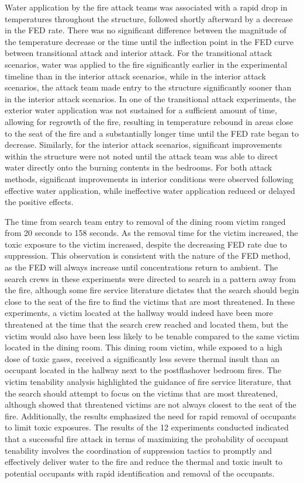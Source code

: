\documentclass[12pt,oneside]{article}
\begin{document}
Water application by the fire attack teams was associated with a rapid drop in temperatures throughout the structure, followed shortly afterward by a decrease in the FED rate. There was no significant difference between the magnitude of the temperature decrease or the time until the inflection point in the FED curve between transitional attack and interior attack. For the transitional attack scenarios, water was applied to the fire significantly earlier in the experimental timeline than in the interior attack scenarios, while in the interior attack scenarios, the attack team made entry to the structure significantly sooner than in the interior attack scenarios. In one of the transitional attack experiments, the exterior water application was not sustained for a sufficient amount of time, allowing for regrowth of the fire, resulting in temperature rebound in areas close to the seat of the fire and a substantially longer time until the FED rate began to decrease. Similarly, for the interior attack scenarios, significant improvements within the structure were not noted until the attack team was able to direct water directly onto the burning contents in the bedrooms. For both attack methods, significant improvements in  interior conditions were observed following effective water application, while ineffective water application reduced or delayed the positive effects.

The time from search team entry to removal of the dining room victim ranged from 20 seconds to 158 seconds.  As the removal time for the victim increased, the toxic exposure to the victim increased, despite the decreasing FED rate due to suppression. This observation is consistent with the nature of the FED method, as the FED will always increase until concentrations return to ambient. The search crews in these experiments were directed to search in a pattern away from the fire, although some fire service literature dictates that the search should begin close to the seat of the fire to find the victims that are most threatened. In these experiments, a victim located at the hallway would indeed have been more threatened at the time that the search crew reached and located them, but the victim would also have been less likely to be tenable compared to the same victim located in the dining room. This dining room victim, while exposed to a high dose of toxic gases, received a significantly less severe thermal insult than an occupant located in the hallway next to the postflashover bedroom fires. The victim tenability analysis highlighted the guidance of fire service literature, that the search should attempt to focus on the victims that are most threatened, although showed that threatened victims are not always closest to the seat of the fire. Additionally, the results emphasized the need for rapid removal of occupants to limit toxic exposures. The results of the 12 experiments conducted indicated that a successful fire attack in terms of maximizing the probability of occupant tenability involves the coordination of suppression tactics to promptly and effectively deliver water to the fire and reduce the thermal and toxic insult to potential occupants with rapid identification and removal of the occupants. 



\end{document}
